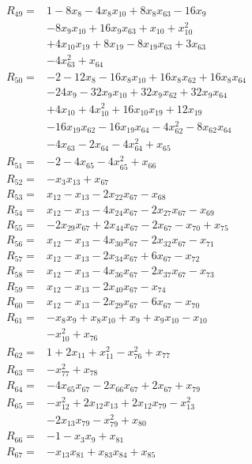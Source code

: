 \begin{align*}
R_{49}={}&1 -8x_{8} -4x_{8}x_{10} +8x_{8}x_{63} -16x_{9}\\
&-8x_{9}x_{10} +16x_{9}x_{63} +x_{10} +x_{10}^{2}\\
&+4x_{10}x_{19} +8x_{19} -8x_{19}x_{63} +3x_{63}\\
&-4x_{63}^{2} +x_{64}\\[3pt]
R_{50}={}&-2 -12x_{8} -16x_{8}x_{10} +16x_{8}x_{62} +16x_{8}x_{64}\\
&-24x_{9} -32x_{9}x_{10} +32x_{9}x_{62} +32x_{9}x_{64}\\
&+4x_{10} +4x_{10}^{2} +16x_{10}x_{19} +12x_{19}\\
&-16x_{19}x_{62} -16x_{19}x_{64} -4x_{62}^{2} -8x_{62}x_{64}\\
&-4x_{63} -2x_{64} -4x_{64}^{2} +x_{65}\\[3pt]
R_{51}={}&-2 -4x_{65} -4x_{65}^{2} +x_{66}\\[3pt]
R_{52}={}&-x_{3}x_{13} +x_{67}\\[3pt]
R_{53}={}&x_{12} -x_{13} -2x_{22}x_{67} -x_{68}\\[3pt]
R_{54}={}&x_{12} -x_{13} -4x_{24}x_{67} -2x_{27}x_{67} -x_{69}\\[3pt]
R_{55}={}&-2x_{29}x_{67} +2x_{44}x_{67} -2x_{67} -x_{70} +x_{75}\\[3pt]
R_{56}={}&x_{12} -x_{13} -4x_{30}x_{67} -2x_{32}x_{67} -x_{71}\\[3pt]
R_{57}={}&x_{12} -x_{13} -2x_{34}x_{67} +6x_{67} -x_{72}\\[3pt]
R_{58}={}&x_{12} -x_{13} -4x_{36}x_{67} -2x_{37}x_{67} -x_{73}\\[3pt]
R_{59}={}&x_{12} -x_{13} -2x_{40}x_{67} -x_{74}\\[3pt]
R_{60}={}&x_{12} -x_{13} -2x_{29}x_{67} -6x_{67} -x_{70}\\[3pt]
R_{61}={}&-x_{8}x_{9} +x_{8}x_{10} +x_{9} +x_{9}x_{10} -x_{10}\\
&-x_{10}^{2} +x_{76}\\[3pt]
R_{62}={}&1 +2x_{11} +x_{11}^{2} -x_{76}^{2} +x_{77}\\[3pt]
R_{63}={}&-x_{77}^{2} +x_{78}\\[3pt]
R_{64}={}&-4x_{65}x_{67} -2x_{66}x_{67} +2x_{67} +x_{79}\\[3pt]
R_{65}={}&-x_{12}^{2} +2x_{12}x_{13} +2x_{12}x_{79} -x_{13}^{2}\\
&-2x_{13}x_{79} -x_{79}^{2} +x_{80}\\[3pt]
R_{66}={}&-1 -x_{3}x_{9} +x_{81}\\[3pt]
R_{67}={}&-x_{13}x_{81} +x_{83}x_{84} +x_{85}\\[3pt]

\end{align*}
